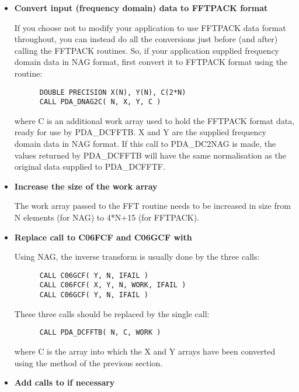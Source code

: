 \begin{itemize}

\item{\bf Convert input (frequency domain) data to FFTPACK format}

   If you choose not to modify your application to use FFTPACK data
   format throughout, you can instead do all the conversions just
   before (and after) calling the FFTPACK routines. So, if your
   application supplied frequency domain data in NAG format, first
   convert it to FFTPACK format using the
   routine:

\begin{verbatim}
      DOUBLE PRECISION X(N), Y(N), C(2*N)
      CALL PDA_DNAG2C( N, X, Y, C )
\end{verbatim}

   where C is an additional work array used to hold the FFTPACK format
   data, ready for use by PDA\_DCFFTB. X and Y are the supplied frequency
   domain data in NAG format. If this call to PDA\_DC2NAG is made, the values
   returned by PDA\_DCFFTB will have the same normalisation as the original
   data supplied to PDA\_DCFFTF.

\item{\bf Increase the size of the work array}

   The work array passed to the FFT routine needs to be increased in
   size from N elements (for NAG) to 4*N+15 (for FFTPACK).

\item{\bf Replace call to C06FCF and C06GCF with
}

   Using NAG, the inverse transform is usually done by the three calls:

\begin{verbatim}
      CALL C06GCF( Y, N, IFAIL )
      CALL C06FCF( X, Y, N, WORK, IFAIL )
      CALL C06GCF( Y, N, IFAIL )
\end{verbatim}

   These three calls should be replaced by the single call:

\begin{verbatim}
      CALL PDA_DCFFTB( N, C, WORK )
\end{verbatim}

   where C is the array into which the X and Y arrays have been converted
   using the method of the previous section.

\item{\bf Add calls to
   if necessary}


\end{itemize}
